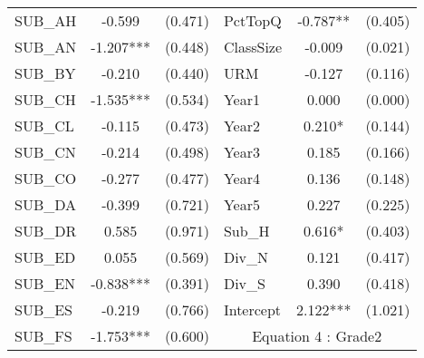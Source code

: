 \begin{table}[htb]
\begin{threeparttable}
\begin{tabular}{l c c|l c c}
    SUB\_AH                                      & -0.599                    & (0.471)              & PctTopQ             & -0.787**               & (0.405)              \\
    SUB\_AN                                      & -1.207***                 & (0.448)              & ClassSize           & -0.009                 & (0.021)              \\
    SUB\_BY                                      & -0.210                    & (0.440)              & URM                 & -0.127                 & (0.116)              \\
    SUB\_CH                                      & -1.535***                 & (0.534)              & Year1               & 0.000                  & (0.000)              \\
    SUB\_CL                                      & -0.115                    & (0.473)              & Year2               & 0.210*                 & (0.144)              \\
    SUB\_CN                                      & -0.214                    & (0.498)              & Year3               & 0.185                  & (0.166)              \\
    SUB\_CO                                      & -0.277                    & (0.477)              & Year4               & 0.136                  & (0.148)              \\
    SUB\_DA                                      & -0.399                    & (0.721)              & Year5               & 0.227                  & (0.225)              \\
    SUB\_DR                                      & 0.585                     & (0.971)              & Sub\_H              & 0.616*                 & (0.403)              \\
    SUB\_ED                                      & 0.055                     & (0.569)              & Div\_N              & 0.121                  & (0.417)              \\
    SUB\_EN                                      & -0.838***                 & (0.391)              & Div\_S              & 0.390                  & (0.418)              \\
    SUB\_ES                                      & -0.219                    & (0.766)              & Intercept           & 2.122***               & (1.021)              \\
    \cline{4-6}
    SUB\_FS                                      & -1.753***                 & (0.600)              & \multicolumn{3}{c}{Equation 4 : Grade2}                             \\

\end{tabular}
\end{threeparttable}
\end{table}
